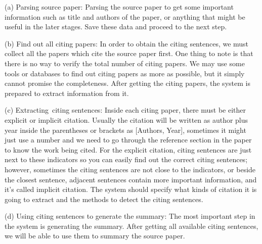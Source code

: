 \documentclass[hyp]{socreport}
\begin{document}


(a) Parsing source paper: Parsing the source paper to get some important information such as title and authors of the paper,
or anything that might be useful in the later stages. Save these data and proceed to the next step.

(b) Find out all citing papers: In order to obtain the citing sentences, we must collect all the papers which cite the source 
paper first. 
One thing to note is that there is no way to verify the total number of citing papers. We may use some tools or 
databases to find out citing papers as more as possible, but it simply cannot promise the completeness. After getting the 
citing papers, the system is prepared to extract information from it.

(c) Extracting citing sentences: Inside each citing paper, there must be either explicit or implicit citation. Usually the 
citation will be written as author plus year inside the parentheses or brackets as [Authors, Year], sometimes it might just 
use a number and we need to go through the reference section in the paper to know the work being cited. For the explicit citation, 
citing sentences are just next to these indicators so you can easily find out the correct citing sentences; however, sometimes the 
citing sentences are not close to the indicators, or beside the closest sentence, adjacent sentences contain more important information, 
and it’s called implicit citation. The system should specify what kinds of citation it is going to extract and the methods to detect 
the citing sentences.

(d) Using citing sentences to generate the summary: The most important step in the system is generating the summary. After getting 
all available citing sentences, we will be able to use them to summary the source paper.  
\end{document}
